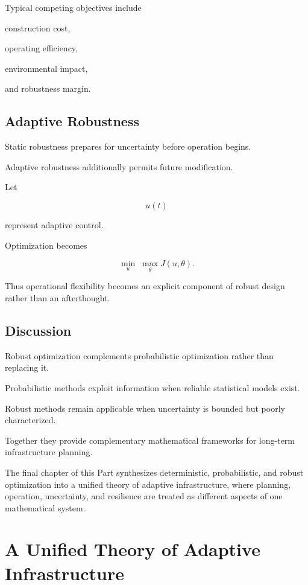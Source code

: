 \documentclass[11pt,fleqn]{book}
\numberwithin{equation}{chapter}
\theoremstyle{plain}
\theoremstyle{definition}
\theoremstyle{remark}
\begin{document}
Typical competing objectives include

construction cost,

operating efficiency,

environmental impact,

and robustness margin.


\section{Adaptive Robustness}

Static robustness prepares for uncertainty before operation begins.

Adaptive robustness additionally permits future modification.

Let

\[
u(t)
\]

represent adaptive control.

Optimization becomes

\[
\min_u
\;
\max_{\theta}
J(u,\theta).
\]

Thus operational flexibility becomes an explicit component of robust
design rather than an afterthought.


\section{Discussion}

Robust optimization complements probabilistic optimization rather than
replacing it.

Probabilistic methods exploit information when reliable statistical
models exist.

Robust methods remain applicable when uncertainty is bounded but poorly
characterized.

Together they provide complementary mathematical frameworks for
long-term infrastructure planning.

The final chapter of this Part synthesizes deterministic, probabilistic, and
robust optimization into a unified theory of adaptive infrastructure,
where planning, operation, uncertainty, and resilience are treated as
different aspects of one mathematical system.

\chapter{A Unified Theory of Adaptive Infrastructure}
\end{document}
